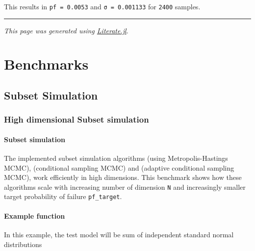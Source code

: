 This results in \texttt{pf = 0.0053} and \texttt{σ = 0.001133} for \texttt{2400} samples.



{\rule{\textwidth}{1pt}}


\emph{This page was generated using \href{https://github.com/fredrikekre/Literate.jl}{Literate.jl}.}



\part{Benchmarks}


\chapter{Subset Simulation}


\section{High dimensional Subset simulation}



\label{14614691805620732692}{}


\subsection{Subset simulation}



\label{12765450934100348318}{}


The implemented subset simulation algorithms  (using Metropolis-Hastings MCMC),  (conditional sampling MCMC) and  (adaptive conditional sampling MCMC), work efficiently in high dimensions. This benchmark shows how these algorithms scale with increasing number of dimension \texttt{N} and increasingly smaller target probability of failure \texttt{pf\_target}.



\subsection{Example function}



\label{15523964065255424817}{}


In this example, the test model will be sum of independent standard normal distributions



